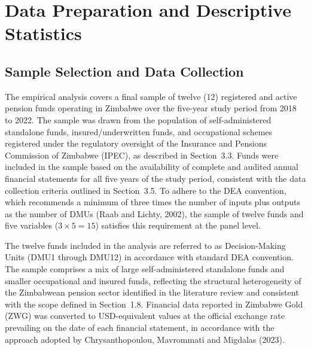 \documentclass[12pt,a4paper]{article}
\begin{document}
\section{Data Preparation and Descriptive Statistics}

\subsection{Sample Selection and Data Collection}

The empirical analysis covers a final sample of twelve (12) registered and active pension funds operating in Zimbabwe over the five-year study period from 2018 to 2022. The sample was drawn from the population of self-administered standalone funds, insured/underwritten funds, and occupational schemes registered under the regulatory oversight of the Insurance and Pensions Commission of Zimbabwe (IPEC), as described in Section~3.3. Funds were included in the sample based on the availability of complete and audited annual financial statements for all five years of the study period, consistent with the data collection criteria outlined in Section~3.5. To adhere to the DEA convention, which recommends a minimum of three times the number of inputs plus outputs as the number of DMUs (Raab and Lichty, 2002), the sample of twelve funds and five variables ($3 \times 5 = 15$) satisfies this requirement at the panel level.

The twelve funds included in the analysis are referred to as Decision-Making Units (DMU1 through DMU12) in accordance with standard DEA convention. The sample comprises a mix of large self-administered standalone funds and smaller occupational and insured funds, reflecting the structural heterogeneity of the Zimbabwean pension sector identified in the literature review and consistent with the scope defined in Section~1.8. Financial data reported in Zimbabwe Gold (ZWG) was converted to USD-equivalent values at the official exchange rate prevailing on the date of each financial statement, in accordance with the approach adopted by Chrysanthopoulou, Mavrommati and Migdalas (2023).
\end{document}
